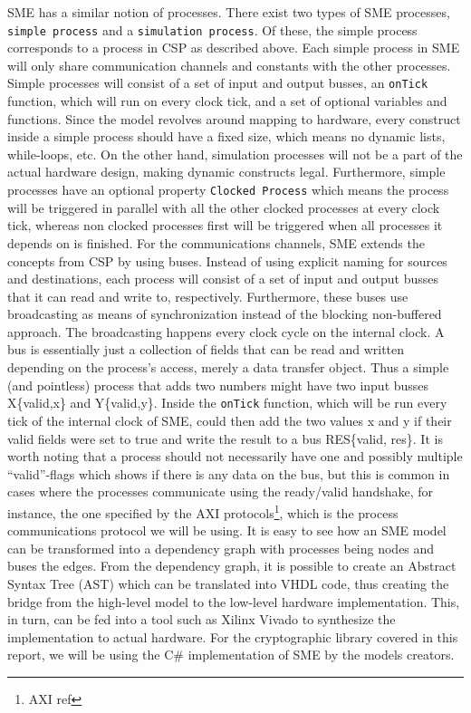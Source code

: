 \documentclass[a4paper, openany]{book}
\begin{document}
\begin{abstact}
SME has a similar notion of processes. There exist two types of SME processes, \texttt{simple process} and a \texttt{simulation process}. Of these, the simple process corresponds to a process in CSP as described above. Each simple process in SME will only share communication channels and constants with the other processes. Simple processes will consist of a set of input and output busses, an \texttt{onTick} function, which will run on every clock tick, and a set of optional variables and functions. Since the model revolves around mapping to hardware, every construct inside a simple process should have a fixed size, which means no dynamic lists, while-loops, etc. On the other hand, simulation processes will not be a part of the actual hardware design, making dynamic constructs legal. Furthermore, simple processes have an optional property \texttt{Clocked Process} which means the process will be triggered in parallel with all the other clocked processes at every clock tick, whereas non clocked processes first will be triggered when all processes it depends on is finished.
For the communications channels, SME extends the concepts from CSP by using buses. Instead of using explicit naming for sources and destinations, each process will consist of a set of input and output busses that it can read and write to, respectively. Furthermore, these buses use broadcasting as means of synchronization instead of the blocking non-buffered approach.  The broadcasting happens every clock cycle on the internal clock.
A bus is essentially just a collection of fields that can be read and written depending on the process's access, merely a data transfer object. Thus a simple (and pointless) process that adds two numbers might have two input busses X\{valid,x\} and Y\{valid,y\}. Inside the \texttt{onTick} function, which will be run every tick of the internal clock of SME, could then add the two values x and y if their valid fields were set to true and write the result to a bus RES\{valid, res\}. It is worth noting that a process should not necessarily have one and possibly multiple ``valid''-flags which shows if there is any data on the bus, but this is common in cases where the processes communicate using the ready/valid handshake, for instance, the one specified by the AXI protocols\footnote{AXI ref}, which is the process communications protocol we will be using. It is easy to see how an SME model can be transformed into a dependency graph with processes being nodes and buses the edges. From the dependency graph, it is possible to create an Abstract Syntax Tree (AST) which can be translated into VHDL code\cite{sme}, thus creating the bridge from the high-level model to the low-level hardware implementation. This, in turn, can be fed into a tool such as Xilinx Vivado to synthesize the implementation to actual hardware. For the cryptographic library covered in this report, we will be using the C\# implementation of SME by the models creators\cite{sme}.

\end{abstact}
\end{document}
